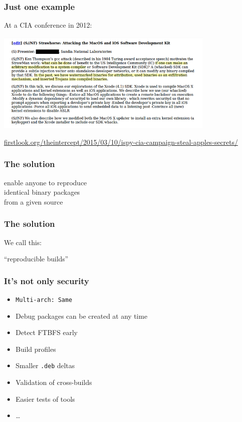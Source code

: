 \documentclass[14pt]{beamer}
\begin{document}
\begin{frame}[fragile]
 \frametitle{Just one example}

 At a CIA conference in 2012:
 \begin{center}
  \includegraphics[width=0.8\textwidth]{images/strawhorse.png}

  {\footnotesize
  \url{firstlook.org/theintercept/2015/03/10/ispy-cia-campaign-steal-apples-secrets/}
  }
 \end{center}
\end{frame}

\begin{frame}
 \frametitle{The solution}

 \begin{center}
 \Large
 enable anyone to reproduce\\
 identical binary packages\\
 from a given source
\end{center}

\end{frame}

\begin{frame}
 \frametitle{The solution}

 \begin{center}
 We call this:

 \Huge
 “reproducible builds”
 \end{center}
\end{frame}

\begin{frame}
 \frametitle{It's not only security}

 \begin{itemize}
  \item \texttt{Multi-arch: Same}
  \item Debug packages can be created at any time
  \item Detect FTBFS early
  \item Build profiles
  \item Smaller \texttt{.deb} deltas
  \item Validation of cross-builds
  \item Easier tests of tools
  \item …
 \end{itemize}
\end{frame}
\end{document}

